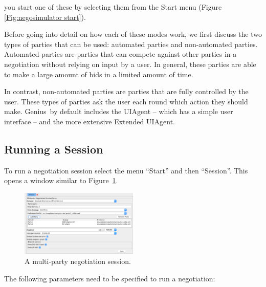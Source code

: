 \documentclass[]{article}
\newcommand\Genius{{\sc Genius}}
\begin{document}
you start one of these by selecting them from the Start menu (Figure \ref{Fig:negosimulator start}).

Before going into detail on how each of these modes work, we first discuss the two types of parties that can be used: automated parties and non-automated parties. Automated parties are parties that can compete against other parties in a negotiation without relying on input by a user. In general, these parties are able to make a large amount of bids in a limited amount of time.

In contrast, non-automated parties are parties that are fully controlled by the user. These types of parties ask the user each round which action they should make. {\Genius}~by default includes the UIAgent -- which has a simple user interface -- and the more extensive Extended UIAgent.


\subsection{Running a Session}\label{sec:singlesessionrun}
To run a negotiation session select the menu ``Start'' and then ``Session''. This opens a window similar to Figure~\ref{Fig:multipartysession}. 

\begin{figure}[h!]
	\centering
	\includegraphics[width=0.5\textwidth]{media/multipartysession.png}
\caption{A multi-party negotiation session.}\label{Fig:multipartysession}
\end{figure}

The following parameters need to be specified to run a negotiation:
\end{document}
